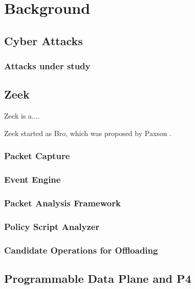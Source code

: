 \chapter{Background}
\label{cap:background}


\section{Cyber Attacks}


\subsection{Attacks under study}


\section{Zeek}
\label{sec:bg:zeek}



Zeek is a.... \cite{AboutZeek}

Zeek started as Bro, which was proposed by Paxson \cite{Paxson1999}.

\subsection{Packet Capture}

\subsection{Event Engine}
\label{sec:bg:zeek_ee}

\subsection{Packet Analysis Framework}
\label{sec:bg:zeek_packet_analysis}

\subsection{Policy Script Analyzer}
\label{sec:bg:zeek_psi}



\subsection{Candidate Operations for Offloading}
\label{sec:bg:zeek_candidate_operations}

\section{Programmable Data Plane and P4}
\label{sec:bg:pdp}
\label{sec:bg:p4}
